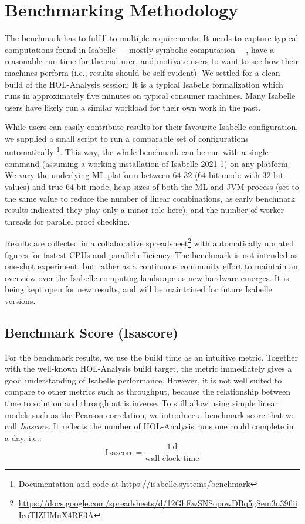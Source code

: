 
\section{Benchmarking Methodology}\label{sec:benchmark}
The benchmark has to fulfill to multiple requirements:
It needs to capture typical computations found in Isabelle
--- mostly symbolic computation ---,
have a reasonable run-time for the end user,
and motivate users to want to see how their machines perform
(i.e., results should be self-evident).
We settled for a clean build of the HOL-Analysis session:
It is a typical Isabelle formalization
which runs in approximately five minutes on typical consumer machines.
Many Isabelle users have likely run a similar workload for their own work in the past.

While users can easily contribute results for their favourite Isabelle configuration,
we supplied a small script to run a comparable set of configurations automatically
\footnote{Documentation and code at \url{https://isabelle.systems/benchmark}}.
This way,
the whole benchmark can be run with a single command
(assuming a working installation of Isabelle 2021-1)
on any platform.
We vary the underlying ML platform between $64\_32$ ($64$-bit mode with $32$-bit values) and true \num{64}-bit mode,
heap sizes of both the ML and JVM process
(set to the same value to reduce the number of linear combinations,
as early benchmark results indicated they play only a minor role here),
and the number of worker threads for parallel proof checking.

Results are collected in a collaborative spreadsheet\footnote{\url{https://docs.google.com/spreadsheets/d/12GhEwSNSopowDBq5gSem3u39fliiIcoTIZHMnX4RE3A}}
with automatically updated figures for fastest CPUs and parallel efficiency.
The benchmark is not intended as one-shot experiment,
but rather as a continuous community effort
to maintain an overview over the Isabelle computing landscape as new hardware emerges.
It is being kept open for new results, and will be maintained for future Isabelle versions.

\subsection{Benchmark Score (Isascore)}
For the benchmark results,
we use the build time as an intuitive metric.
Together with the well-known HOL-Analysis build target,
the metric immediately gives a good understanding of Isabelle performance.
However, it is not well suited to compare to other metrics such as throughput,
because the relationship between time to solution and throughput is inverse.
To still allow using simple linear models such as the Pearson correlation,
we introduce a benchmark score that we call \emph{Isascore}.
It reflects the number of HOL-Analysis runs one could complete in a day, i.e.:
\begin{equation}
    \text{Isascore}=\frac{\SI{1}{\day}}{\text{wall-clock time}}
\end{equation}

